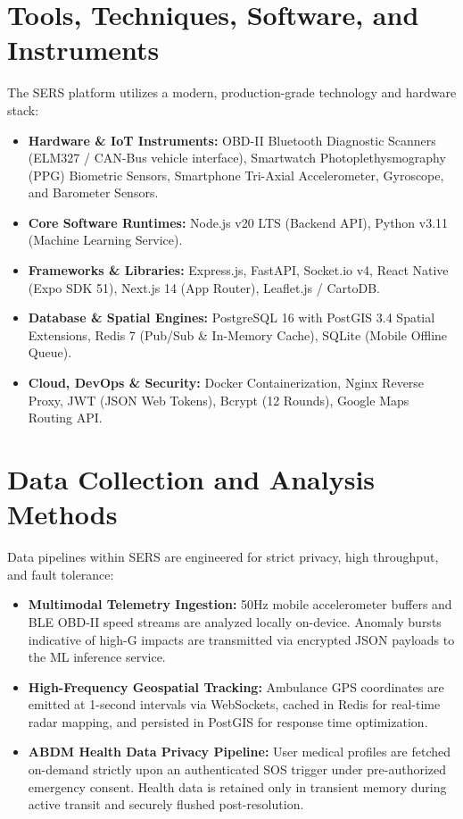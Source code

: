 \documentclass[12pt,a4paper]{article}
\begin{document}
\clearpage
\section{Tools, Techniques, Software, and Instruments}
The SERS platform utilizes a modern, production-grade technology and hardware stack:
\begin{itemize}
    \item \textbf{Hardware \& IoT Instruments:} OBD-II Bluetooth Diagnostic Scanners (ELM327 / CAN-Bus vehicle interface), Smartwatch Photoplethysmography (PPG) Biometric Sensors, Smartphone Tri-Axial Accelerometer, Gyroscope, and Barometer Sensors.
    \item \textbf{Core Software Runtimes:} Node.js v20 LTS (Backend API), Python v3.11 (Machine Learning Service).
    \item \textbf{Frameworks \& Libraries:} Express.js, FastAPI, Socket.io v4, React Native (Expo SDK 51), Next.js 14 (App Router), Leaflet.js / CartoDB.
    \item \textbf{Database \& Spatial Engines:} PostgreSQL 16 with PostGIS 3.4 Spatial Extensions, Redis 7 (Pub/Sub \& In-Memory Cache), SQLite (Mobile Offline Queue).
    \item \textbf{Cloud, DevOps \& Security:} Docker Containerization, Nginx Reverse Proxy, JWT (JSON Web Tokens), Bcrypt (12 Rounds), Google Maps Routing API.
\end{itemize}

\section{Data Collection and Analysis Methods}
Data pipelines within SERS are engineered for strict privacy, high throughput, and fault tolerance:
\begin{itemize}
    \item \textbf{Multimodal Telemetry Ingestion:} 50Hz mobile accelerometer buffers and BLE OBD-II speed streams are analyzed locally on-device. Anomaly bursts indicative of high-G impacts are transmitted via encrypted JSON payloads to the ML inference service.
    \item \textbf{High-Frequency Geospatial Tracking:} Ambulance GPS coordinates are emitted at 1-second intervals via WebSockets, cached in Redis for real-time radar mapping, and persisted in PostGIS for response time optimization.
    \item \textbf{ABDM Health Data Privacy Pipeline:} User medical profiles are fetched on-demand strictly upon an authenticated SOS trigger under pre-authorized emergency consent. Health data is retained only in transient memory during active transit and securely flushed post-resolution.
\end{itemize}
\end{document}
